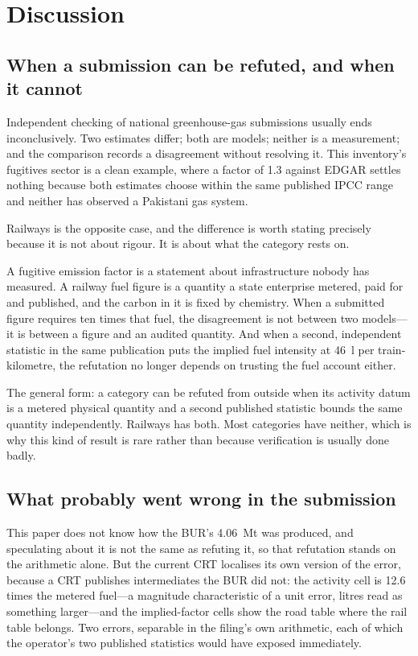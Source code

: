 \section{Discussion}
\label{sec:discussion}

\subsection{When a submission can be refuted, and when it cannot}

Independent checking of national greenhouse-gas submissions usually ends inconclusively. Two
estimates differ; both are models; neither is a measurement; and the comparison records a
disagreement without resolving it. This inventory's fugitives sector is a clean example, where
a factor of \num{1.3} against EDGAR settles nothing because both estimates choose within the
same published IPCC range and neither has observed a Pakistani gas system.

Railways is the opposite case, and the difference is worth stating precisely because it is not
about rigour. It is about what the category rests on.

A fugitive emission factor is a statement about infrastructure nobody has measured. A railway
fuel figure is a quantity a state enterprise metered, paid for and published, and the carbon
in it is fixed by chemistry. When a submitted figure requires ten times that fuel, the
disagreement is not between two models---it is between a figure and an audited quantity. And
when a second, independent statistic in the same publication puts the implied fuel intensity at
\SI{46}{\litre} per train-kilometre, the refutation no longer depends on trusting the fuel
account either.

The general form: a category can be refuted from outside when its activity datum is a metered
physical quantity and a second published statistic bounds the same quantity independently.
Railways has both. Most categories have neither, which is why this kind of result is rare
rather than because verification is usually done badly.

\subsection{What probably went wrong in the submission}

This paper does not know how the BUR's \SI{4.06}{\mega\tonne} was produced, and
speculating about it is not the same as refuting it, so that refutation stands on the
arithmetic alone. But the current CRT localises its own version of the error, because a
CRT publishes intermediates the BUR did not: the activity cell is \num{12.6} times the
metered fuel---a magnitude characteristic of a unit error, litres read as something
larger---and the implied-factor cells show the road table where the rail table belongs.
Two errors, separable in the filing's own arithmetic, each of which the operator's two
published statistics would have exposed immediately.

